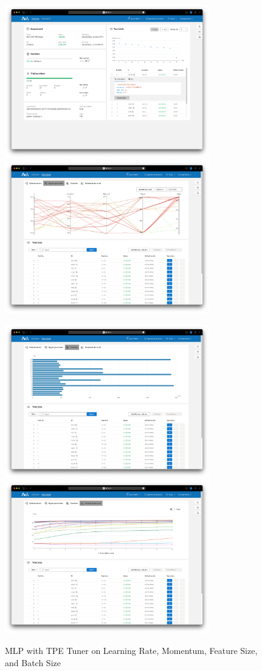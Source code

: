 \documentclass{article}
\begin{document}
\begin{figure}
	\centerline{\includegraphics[width=3.5in]{../proj3/figures/mlp_tpe_batch_overview.png}\includegraphics[width=3.5in]{../proj3/figures/mlp_tpe_batch_hyperparameter.png}}
	\centerline{\includegraphics[width=3.5in]{../proj3/figures/mlp_tpe_batch_latency.png}\includegraphics[width=3.5in]{../proj3/figures/mlp_tpe_batch_intermediate.png}}
	\caption{MLP with TPE Tuner on Learning Rate, Momentum, Feature Size, and Batch Size}
	\label{fig:mlp-tpe-batch}
\end{figure}
\end{document}
